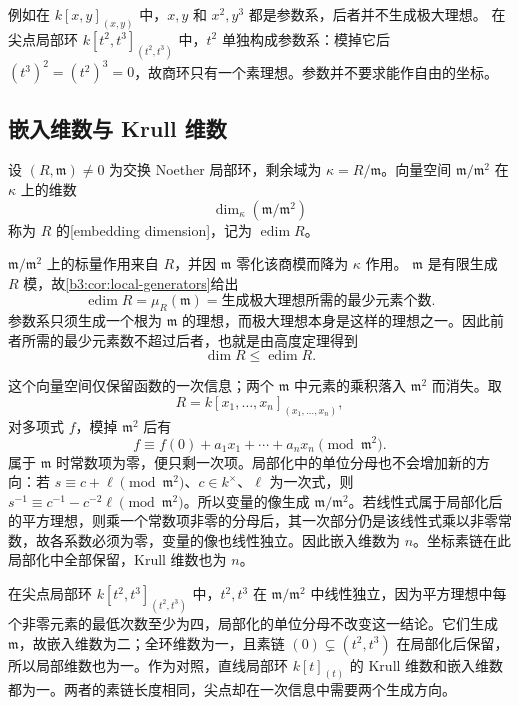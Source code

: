 \ProseParagraphBreak
例如在 \(k[x,y]_{(x,y)}\) 中，\(x,y\) 和 \(x^2,y^3\) 都是参数系，后者并不生成极大理想。 在尖点局部环 \(k[t^2,t^3]_{(t^2,t^3)}\) 中，\(t^2\) 单独构成参数系：模掉它后 \((t^3)^2=(t^2)^3=0\)，故商环只有一个素理想。参数并不要求能作自由的坐标。

\subsection{嵌入维数与 Krull 维数}
\label{b3:subsec:0904:02}

\begin{definition}\label{b3:def:embedding-dimension}
	设 \((R,\mathfrak m)\ne0\) 为交换 Noether 局部环，剩余域为 \(\kappa=R/\mathfrak m\)。向量空间 \(\mathfrak m/\mathfrak m^2\) 在 \(\kappa\) 上的维数
	\[
		\dim_\kappa(\mathfrak m/\mathfrak m^2)
	\]
	称为 \(R\) 的[embedding dimension]，记为 \(\operatorname{edim}R\)。
\end{definition}

\(\mathfrak m/\mathfrak m^2\) 上的标量作用来自 \(R\)，并因 \(\mathfrak m\) 零化该商模而降为 \(\kappa\) 作用。 \(\mathfrak m\) 是有限生成 \(R\) 模，故\cref{b3:cor:local-generators}给出
\[
	\operatorname{edim}R=\mu_R(\mathfrak m) =\text{生成极大理想所需的最少元素个数}.
\]
参数系只须生成一个根为 \(\mathfrak m\) 的理想，而极大理想本身是这样的理想之一。因此前者所需的最少元素数不超过后者，也就是由高度定理得到
\begin{equation}\label{b3:eq:dimension-embedding-bound}
	\dim R\le\operatorname{edim}R.
\end{equation}

这个向量空间仅保留函数的一次信息；两个 \(\mathfrak m\) 中元素的乘积落入 \(\mathfrak m^2\) 而消失。取
\[
	R=k[x_1,\ldots,x_n]_{(x_1,\ldots,x_n)},
\]
对多项式 \(f\)，模掉 \(\mathfrak m^2\) 后有
\[
	f\equiv f(0)+a_1x_1+\cdots+a_nx_n\pmod{\mathfrak m^2}.
\]
属于 \(\mathfrak m\) 时常数项为零，便只剩一次项。局部化中的单位分母也不会增加新的方向：若 \(s\equiv c+\ell\pmod{\mathfrak m^2}\)、\(c\in k^\times\)、\(\ell\) 为一次式，则 \(s^{-1}\equiv c^{-1}-c^{-2}\ell\pmod{\mathfrak m^2}\)。所以变量的像生成 \(\mathfrak m/\mathfrak m^2\)。若线性式属于局部化后的平方理想，则乘一个常数项非零的分母后，其一次部分仍是该线性式乘以非零常数，故各系数必须为零，变量的像也线性独立。因此嵌入维数为 \(n\)。坐标素链在此局部化中全部保留，Krull 维数也为 \(n\)。

\ProseParagraphBreak
在尖点局部环 \(k[t^2,t^3]_{(t^2,t^3)}\) 中，\(t^2,t^3\) 在 \(\mathfrak m/\mathfrak m^2\) 中线性独立，因为平方理想中每个非零元素的最低次数至少为四，局部化的单位分母不改变这一结论。它们生成 \(\mathfrak m\)，故嵌入维数为二；全环维数为一，且素链 \((0)\subsetneq(t^2,t^3)\) 在局部化后保留，所以局部维数也为一。作为对照，直线局部环 \(k[t]_{(t)}\) 的 Krull 维数和嵌入维数都为一。两者的素链长度相同，尖点却在一次信息中需要两个生成方向。

